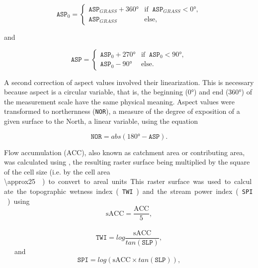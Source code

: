 \begin{equation}
 \texttt{ASP}_{0} =
 \begin{cases}
  \texttt{ASP}_{GRASS} + \ang{360} & \text{if}\;\; \texttt{ASP}_{GRASS} < \ang{0}, \\
  \texttt{ASP}_{GRASS}             & \text{else},
 \end{cases}
\end{equation}

\noindent and

\begin{equation}
 \texttt{ASP} =
 \begin{cases}
  \texttt{ASP}_{0} + \ang{270} & \text{if}\;\; \texttt{ASP}_{0} < \ang{90}, \\
  \texttt{ASP}_{0} - \ang{90}  & \text{else}.
 \end{cases}
\end{equation}

\noindent A second correction of aspect values involved their linearization. This is necessary because aspect 
is a circular variable, that is, the beginning (\ang{0}) and end (\ang{360}) of the measurement scale have the 
same physical meaning. Aspect values were transformed to northernness (\texttt{NOR}), a measure of the degree 
of exposition of a given surface to the North, a linear variable, using the equation

\begin{equation}
 \texttt{NOR} = abs(\ang{180} - \texttt{ASP}).
\end{equation}\label{eq:NOR}  

Flow accumulation (ACC), also known as catchment area or contributing area, was calculated using 
, the resulting raster surface being multiplied by the square of the cell size (i.e. by the 
cell area \SI{\approx25}{\metre\square}) to convert to areal units. This raster surface was used to calculate 
the topographic wetness index (\texttt{TWI}) and the stream power index (\texttt{SPI}) using

\begin{equation}
 \text{sACC} = \dfrac{\text{ACC}}{5},
\end{equation}\label{eq:sACC}

\begin{equation}
 \texttt{TWI} = log \dfrac{\text{sACC}}{tan(\texttt{SLP})},
\end{equation}\label{eq:TWI}

\noindent and

\begin{equation}
 \texttt{SPI} = log(\text{sACC} \times tan(\texttt{SLP})),
\end{equation}\label{eq:SPI}


